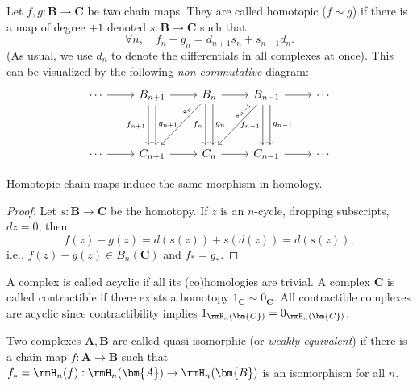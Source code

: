 \begin{defn}
    Let $f,g:\bm{B}\to \bm{C}$ be two chain maps. They are called homotopic ($f\sim g$) if there is a map of degree $+1$ denoted $s:\bm{B}\to \bm{C}$ such that 
    \[\forall n,\quad f_n-g_n=d_{n+1}s_n+s_{n-1}d_n.\]
    (As usual, we use $d_n$ to denote the differentials in all complexes at once).
    This can be visualized by the following \emph{non-commutative} diagram:
     \[\begin{tikzcd}
        \cdots\ar[r] & B_{n+1}\ar[r]\ar[dd,swap, xshift=-.75ex,"f_{n+1}"]\ar[dd,xshift=.75ex,"g_{n+1}"] & B_{n} \arrow[r]\ar[dd,swap,xshift=-.75ex,"f_n"]\ar[dd,xshift=.75ex,"g_n"]\ar[ddl,sloped, near start,"s_n"] & B_{n-1}\ar[dd,swap,xshift=-.75ex,"f_{n-1}"]\ar[dd,xshift=.75ex,"g_{n-1}"]\ar[r]\ar[ddl, near start,sloped,"s_{n-1}"] & \cdots \\
        &&&&\\
       \cdots\ar[r] & C_{n+1}\ar[r] & C_n\ar[r] &C_{n-1} \ar[r] &\cdots
    \end{tikzcd}\]
\end{defn}

\begin{thm}\label{thm chain homotopy in homology}
    Homotopic chain maps induce the same morphism in homology.
\end{thm}
\begin{proof}
     Let $s:\bm{B}\to\bm{C}$ be the homotopy. If $z$ is an $n$-cycle, dropping subscripts, $d z=0$, then
     \[f(z)-g(z)=d(s(z))+s(d(z))=d(s(z)),\]
     i.e., $f(z)-g(z)\in B_n(\bm{C})$ and $f_\ast=g_\ast$.
\end{proof}

\begin{defn}
    A complex is called acyclic if all its (co)homologies are trivial. A complex $\bm{C}$ is called contractible if there exists a homotopy $1_{\bm{C}}\sim 0_{\bm{C}}$. 
    All contractible complexes are acyclic since contractibility implies $1_{\rmH_n(\bm{C})}=0_{\rmH_n(\bm{C})}$.
\end{defn}

\begin{defn}
    Two complexes $\bm{A},\bm{B}$ are called quasi-isomorphic (or \emph{weakly equivalent}) if there is a chain map $f:\bm{A}\to \bm{B}$ such that $f_\ast=\rmH_n(f):\rmH_n(\bm{A})\to \rmH_n(\bm{B})$ is an isomorphism for all $n$.
\end{defn}

